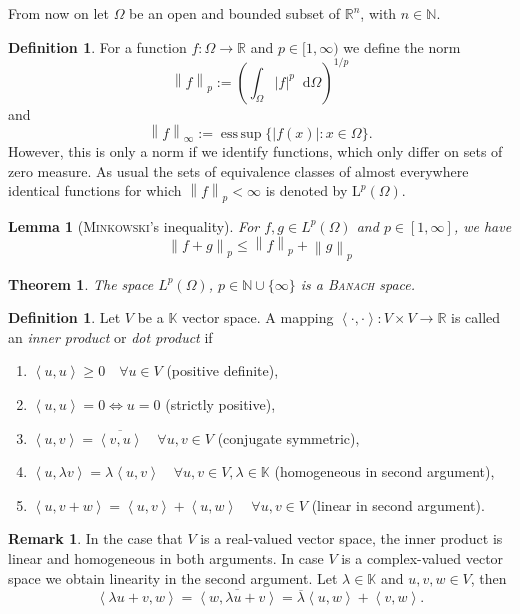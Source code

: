 \documentclass[12pt,a4paper,twoside, open=right]{scrreprt}
\theoremstyle{definition}
\newtheorem{rem}[auf]{Remark}
\newtheorem{defn}[auf]{Definition}
\theoremstyle{plain}
\newtheorem{sa}[auf]{Theorem}
\newtheorem{lem}[auf]{Lemma}
\DeclareMathOperator*{\esssup}{ess\,sup} %
\newcommand{\abs}[1]{\left\vert #1\right\vert}
\newcommand{\dotp}[2]{\left\langle #1,#2\right\rangle}
\newcommand{\rr}{\mathbb{R}}
\newcommand{\kk}{\mathbb{K}}
\newcommand{\nn}{\mathbb{N}}
\newcommand{\norm}[1]{\left\lVert#1\right\rVert}
\newcommand{\D}{\mathop{}\!\mathrm{d}}
\begin{document}
From now on let $\Omega$ be an open and bounded subset of $\rr^n$, with $n\in\nn$.
\begin{defn}
    For a function $f\colon\Omega\to\rr$ and $p\in[1,\infty)$ we define the norm
     \begin{equation}
    \norm{f}_{p}:=\left(\int_\Omega\abs{f}^p\D\Omega\right)^{1/p}
    \end{equation}
    and
     \begin{equation}
    \norm{f}_{\infty}:=\esssup\{\abs{f(x)}\colon x\in\Omega\}.
    \end{equation}
    However, this is only a norm if we identify functions, which only differ on sets of zero measure. As usual the sets of equivalence classes of almost everywhere identical functions for which $\norm{f}_p<\infty$ is denoted by $\mathrm{L}^p(\Omega)$.
\end{defn}
\begin{lem}[\textsc{Minkowski}'s inequality]
    For $f,g\in L^p(\Omega)$ and $p\in[1,\infty]$, we have
    \begin{equation}
        \norm{f+g}_p\le\norm{f}_p+\norm{g}_p
    \end{equation}
\end{lem}
\begin{sa}
    The space $L^p(\Omega)$, $p\in\nn\cup\{\infty\}$ is a \textsc{Banach} space.
\end{sa}
\begin{defn}
    Let $V$ be a $\kk$ vector space. A mapping $\dotp{\cdot}{\cdot}\colon V\times V\to\rr$ is called an \emph{inner product} or \emph{dot product} if 
    \begin{enumerate}
        \item $\dotp{u}{u} \ge 0 \quad \forall u\in V$ (positive definite),
        \item $\dotp{u}{u} = 0 \Leftrightarrow u=0 $  (strictly positive),
        \item $\dotp{u}{v} = \overline{\dotp{v}{u}}   \quad\forall u,v\in V$ (conjugate symmetric),
        \item $\dotp{u}{\lambda v} = \lambda\dotp{u}{v} \quad\forall u,v\in V,\lambda\in\kk$ (homogeneous in second argument),
        \item $\dotp{u}{v+w} =\dotp{u}{v}+\dotp{u}{w} \quad\forall u,v\in V$ (linear in second argument).
    \end{enumerate}
\end{defn}
\begin{rem}
    In the case that $V$ is a real-valued vector space, the inner product is linear and homogeneous in both arguments. In case $V$ is a complex-valued vector space we obtain linearity in the second argument. Let $\lambda\in\kk$ and $u,v,w\in V$, then
    \begin{equation}
        \dotp{\lambda u +v}{w}=\overline{\dotp{w}{\lambda u + v}}=\overline{\lambda}\dotp{u}{w}+\dotp{v}{w}.
    \end{equation}
\end{rem}
\end{document}
